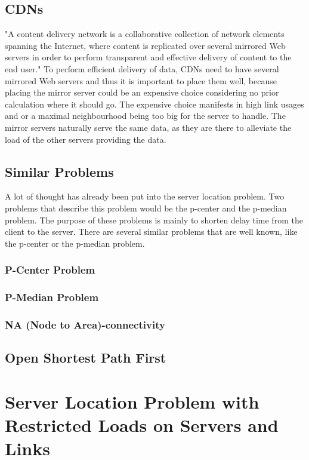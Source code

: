 \documentclass [12pt]{article}
\begin{document}
    \subsection {CDNs}
        "A content delivery network is a collaborative collection of network elements spanning
        the Internet, where content is replicated over several mirrored Web servers in order
        to perform transparent and effective delivery of content to the end user."\cite[p. 3]{Buyya:2008:CDN:1457653}
        To perform efficient delivery of data, CDNs need to have several mirrored Web servers
        and thus it is important to place them well, because placing the mirror server 
        could be an expensive choice considering no prior calculation where it should go. 
        The expensive choice manifests in high link usages and or a maximal neighbourhood being
        too big for the server to handle.
        The mirror servers naturally serve the same data, as they are there to alleviate the 
        load of the other servers providing the data.
        
    \subsection {Similar Problems}
    A lot of thought has already been put into the server location problem.
    Two problems that describe this problem would be the p-center and the
    p-median problem. The purpose of these problems is mainly to shorten delay
    time from the client to the server. 
    There are several similar problems that are well known, like the p-center
    or the p-median problem. 
    \subsubsection {P-Center Problem}
    \subsubsection {P-Median Problem}
    \subsubsection {NA (Node to Area)-connectivity}
    \subsection{Open Shortest Path First}
\section{Server Location Problem with Restricted Loads on Servers and Links}
\end{document}
